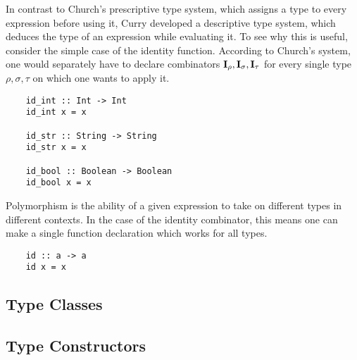 In contrast to Church's prescriptive type system, which assigns a type to every expression before using it, Curry developed a descriptive type system, which deduces the type of an expression while evaluating it. To see why this is useful, consider the simple case of the identity function. According to Church's system, one would separately have to declare combinators $\textbf I_\rho, \textbf I_\sigma, \textbf I_\tau$ for every single type $\rho, \sigma, \tau$ on which one wants to apply it.

\begin{lstlisting}
    id_int :: Int -> Int
    id_int x = x
    
    id_str :: String -> String
    id_str x = x
    
    id_bool :: Boolean -> Boolean
    id_bool x = x
\end{lstlisting}

Polymorphism is the ability of a given expression to take on different types in different contexts. In the case of the identity combinator, this means one can make a single function declaration which works for all types.

\begin{lstlisting}
    id :: a -> a
    id x = x
\end{lstlisting}

\subsection{Type Classes}
\subsection{Type Constructors} 
